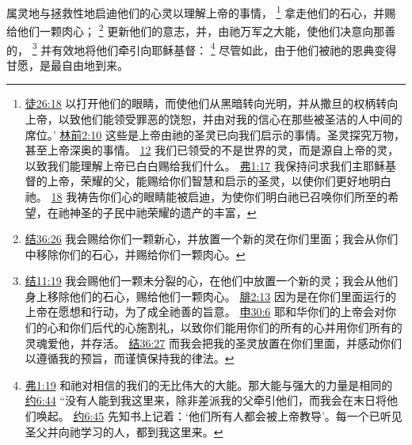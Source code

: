 \documentclass[12pt, a4paper, oneside]{ctexart}
\begin{document}
	属灵地与拯救性地启迪他们的心灵以理解上帝的事情，
	\footnote {
		\href{https://biblehub.com/acts/26-18.htm}{徒26:18} 以打开他们的眼睛，而使他们从黑暗转向光明，并从撒旦的权柄转向上帝，以致他们能领受罪恶的饶恕，并由对我的信心在那些被圣洁的人中间的席位。’
		\href{https://biblehub.com/1_corinthians/2-10.htm}{林前2:10} 这些是上帝由祂的圣灵已向我们启示的事情。圣灵探究万物，甚至上帝深奥的事情。
		\href{https://biblehub.com/1_corinthians/2-12.htm}{12} 我们已领受的不是世界的灵，而是源自上帝的灵，以致我们能理解上帝已白白赐给我们什么。
		\href{https://biblehub.com/ephesians/1-17.htm}{弗1:17} 我保持问求我们主耶稣基督的上帝，荣耀的父，能赐给你们智慧和启示的圣灵，以使你们更好地明白祂。
		\href{https://biblehub.com/ephesians/1-18.htm}{18} 我祷告你们心的眼睛能被启迪，为使你们明白祂已召唤你们所至的希望，在祂神圣的子民中祂荣耀的遗产的丰富，
	}
	拿走他们的石心，并赐给他们一颗肉心；
	\footnote {
		\href{https://biblehub.com/ezekiel/36-26.htm}{结36:26} 我会赐给你们一颗新心，并放置一个新的灵在你们里面；我会从你们中移除你们的石心，并赐给你们一颗肉心。
	}
	更新他们的意志，并，由祂万军之大能，使他们决意向那善的，
	\footnote {
		\href{https://biblehub.com/ezekiel/11-19.htm}{结11:19} 我会赐他们一颗未分裂的心，在他们中放置一个新的灵；我会从他们身上移除他们的石心，赐给他们一颗肉心。
		\href{https://biblehub.com/philippians/2-13.htm}{腓2:13} 因为是在你们里面运行的上帝在愿想和行动，为了成全祂善的旨意。
		\href{https://biblehub.com/deuteronomy/30-6.htm}{申30:6} 耶和华你们的上帝会对你们的心和你们后代的心施割礼，以致你们能用你们的所有的心并用你们所有的灵魂爱他，并存活。
		\href{https://biblehub.com/ezekiel/36-27.htm}{结36:27} 而我会把我的圣灵放置在你们里面，并感动你们以遵循我的预旨，而谨慎保持我的律法。
	}
	并有效地将他们牵引向耶稣基督：
	\footnote {
		\href{https://biblehub.com/ephesians/1-19.htm}{弗1:19} 和祂对相信的我们的无比伟大的大能。那大能与强大的力量是相同的
		\href{https://biblehub.com/john/6-44.htm}{约6:44} “没有人能到我这里来，除非差派我的父牵引他们，而我会在末日将他们唤起。
		\href{https://biblehub.com/john/6-45.htm}{约6:45} 先知书上记着：‘他们所有人都会被上帝教导’。每一个已听见圣父并向祂学习的人，都到我这里来。
	}
	尽管如此，由于他们被祂的恩典变得甘愿，是最自由地到来。
\end{document}
